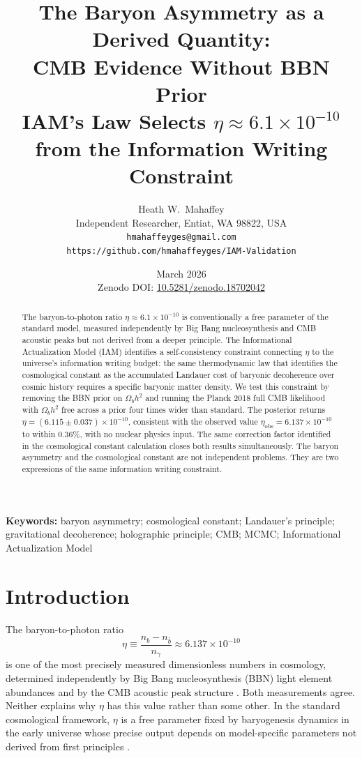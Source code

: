 \documentclass[12pt,a4paper]{article}
\title{\textbf{The Baryon Asymmetry as a Derived Quantity:\\
CMB Evidence Without BBN Prior}\\
\large IAM's Law Selects $\eta \approx 6.1 \times 10^{-10}$
from the Information Writing Constraint}
\author{Heath W.\ Mahaffey\\
\small Independent Researcher, Entiat, WA 98822, USA\\
\small \texttt{hmahaffeyges@gmail.com}\\
\small \texttt{https://github.com/hmahaffeyges/IAM-Validation}}
\date{March 2026\\
\small Zenodo DOI:
\href{https://doi.org/10.5281/zenodo.18702042}{10.5281/zenodo.18702042}}
\begin{document}
\maketitle

\begin{abstract}
The baryon-to-photon ratio $\eta \approx 6.1 \times 10^{-10}$ is
conventionally a free parameter of the standard model, measured
independently by Big Bang nucleosynthesis and CMB acoustic peaks but
not derived from a deeper principle. The Informational Actualization
Model (IAM) identifies a self-consistency constraint connecting $\eta$
to the universe's information writing budget: the same thermodynamic
law that identifies the cosmological constant as the accumulated
Landauer cost of baryonic decoherence over cosmic history
\citep{mahaffey2026_cc} requires a specific baryonic matter density.
We test this constraint by removing the BBN prior on $\Omega_b h^2$
and running the Planck 2018 full CMB likelihood with $\Omega_b h^2$
free across a prior four times wider than standard. The posterior
returns $\eta = (6.115 \pm 0.037) \times 10^{-10}$, consistent
with the observed value $\eta_\mathrm{obs} = 6.137 \times 10^{-10}$
to within $0.36\%$, with no nuclear physics input. The same correction
factor identified in the cosmological constant calculation
\citep{mahaffey2026_cc} closes both results simultaneously. The
baryon asymmetry and the cosmological constant are not independent
problems. They are two expressions of the same information writing
constraint.
\end{abstract}

\noindent\textbf{Keywords:} baryon asymmetry; cosmological constant;
Landauer's principle; gravitational decoherence; holographic principle;
CMB; MCMC; Informational Actualization Model

\section{Introduction}
\label{sec:intro}

The baryon-to-photon ratio
\begin{equation}
\eta \equiv \frac{n_b - n_{\bar{b}}}{n_\gamma}
\approx 6.137 \times 10^{-10}
\label{eq:eta_obs}
\end{equation}
is one of the most precisely measured dimensionless numbers in
cosmology, determined independently by Big Bang nucleosynthesis (BBN)
light element abundances \citep{cyburt2016} and by the CMB acoustic
peak structure \citep{planck2020}. Both measurements agree. Neither
explains why $\eta$ has this value rather than some other. In the
standard cosmological framework, $\eta$ is a free parameter fixed by
baryogenesis dynamics in the early universe whose precise output
depends on model-specific parameters not derived from first
principles \citep{rubakov1996, davidson2008}.
\end{document}
